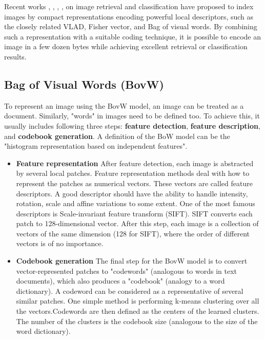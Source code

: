 \documentclass[12pt]{article}
\numberwithin{equation}{section}
\numberwithin{table}{section}
\numberwithin{figure}{section}
\begin{document}
Recent works \cite{Arandjelovic2013}, \cite{Delhumeau2013}, \cite{Sanchez2013}, \cite{Singh2012}, \cite{Ke2003} on image retrieval and classification have proposed to index images by compact representations encoding powerful local descriptors, such as the closely related VLAD,  Fisher vector, and Bag of visual words. By combining such a representation with a suitable coding technique, it is possible to encode an image in a few dozen bytes while achieving excellent retrieval or classification results. 

\subsection{Bag of Visual Words (BovW)} \label{bow}

To represent an image using the BovW model, an image can be treated as a document. Similarly, "words" in images need to be defined too. To achieve this, it usually includes following three steps: \textbf{feature detection}, \textbf{feature description}, and \textbf{codebook generation}. A definition of the BoW model can be the "histogram representation based on independent features".

\begin{itemize}

\item \textbf{Feature representation} After feature detection, each image is abstracted by several local patches. Feature representation methods deal with how to represent the patches as numerical vectors. These vectors are called feature descriptors. A good descriptor should have the ability to handle intensity, rotation, scale and affine variations to some extent. One of the most famous descriptors is Scale-invariant feature transform (SIFT). SIFT converts each patch to 128-dimensional vector. After this step, each image is a collection of vectors of the same dimension (128 for SIFT), where the order of different vectors is of no importance.

\item \textbf{Codebook generation} The final step for the BovW model is to convert vector-represented patches to "codewords" (analogous to words in text documents), which also produces a "codebook" (analogy to a word dictionary). A codeword can be considered as a representative of several similar patches. One simple method is performing k-means clustering over all the vectors.Codewords are then defined as the centers of the learned clusters. The number of the clusters is the codebook size (analogous to the size of the word dictionary).

\end{itemize}
\end{document}
